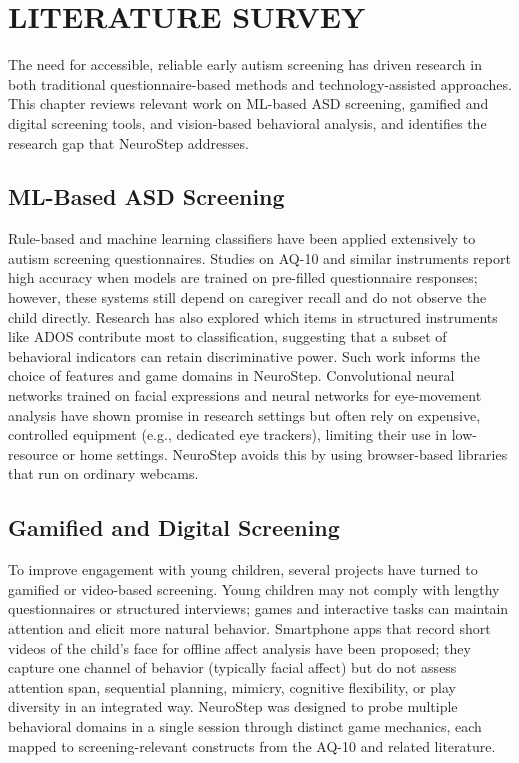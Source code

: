 \documentclass[12pt,a4paper]{report}
\begin{document}
\chapter{LITERATURE SURVEY}
The need for accessible, reliable early autism screening has driven research in both traditional questionnaire-based methods and technology-assisted approaches. This chapter reviews relevant work on ML-based ASD screening, gamified and digital screening tools, and vision-based behavioral analysis, and identifies the research gap that NeuroStep addresses.
\section{ML-Based ASD Screening}
Rule-based and machine learning classifiers have been applied extensively to autism screening questionnaires. Studies on AQ-10 and similar instruments report high accuracy when models are trained on pre-filled questionnaire responses; however, these systems still depend on caregiver recall and do not observe the child directly. Research has also explored which items in structured instruments like ADOS contribute most to classification, suggesting that a subset of behavioral indicators can retain discriminative power. Such work informs the choice of features and game domains in NeuroStep. Convolutional neural networks trained on facial expressions and neural networks for eye-movement analysis have shown promise in research settings but often rely on expensive, controlled equipment (e.g., dedicated eye trackers), limiting their use in low-resource or home settings. NeuroStep avoids this by using browser-based libraries that run on ordinary webcams.
\section{Gamified and Digital Screening}
To improve engagement with young children, several projects have turned to gamified or video-based screening. Young children may not comply with lengthy questionnaires or structured interviews; games and interactive tasks can maintain attention and elicit more natural behavior. Smartphone apps that record short videos of the child's face for offline affect analysis have been proposed; they capture one channel of behavior (typically facial affect) but do not assess attention span, sequential planning, mimicry, cognitive flexibility, or play diversity in an integrated way. NeuroStep was designed to probe multiple behavioral domains in a single session through distinct game mechanics, each mapped to screening-relevant constructs from the AQ-10 and related literature.
\end{document}
